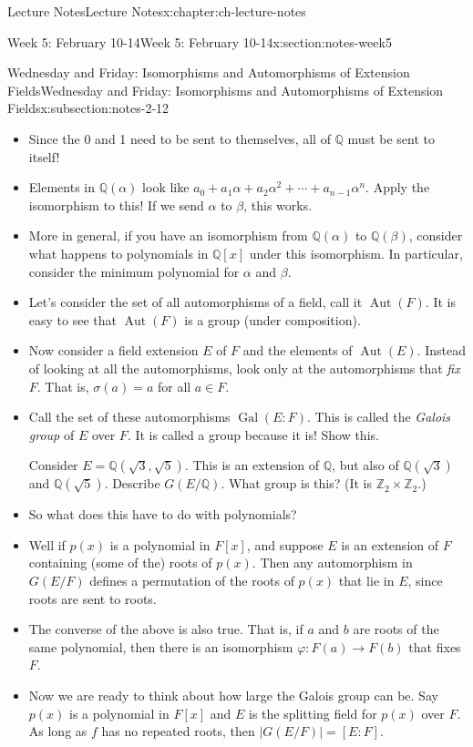 \documentclass[oneside,11pt,]{book}
\newcommand{\Q}{\mathbb{Q}}
\begin{document}
\begin{chapterptx}{Lecture Notes}{}{Lecture Notes}{}{}{x:chapter:ch-lecture-notes}
\begin{sectionptx}{Week 5: February 10-14}{}{Week 5: February 10-14}{}{}{x:section:notes-week5}
\begin{subsectionptx}{Wednesday and Friday: Isomorphisms and Automorphisms of Extension Fields}{}{Wednesday and Friday: Isomorphisms and Automorphisms of Extension Fields}{}{}{x:subsection:notes-2-12}
\begin{itemize}[label=\textbullet]
\item{}Since the 0 and 1 need to be sent to themselves, all of \(\mathbb Q\) must be sent to itself!%
\item{}Elements in \(\mathbb Q(\alpha)\) look like \(a_0 + a_1\alpha + a_2\alpha^2 + \cdots + a_{n-1}\alpha^n\). Apply the isomorphism to this! If we send \(\alpha\) to \(\beta\), this works.%
\item{}More in general, if you have an isomorphism from \(\mathbb Q(\alpha)\) to \(\mathbb Q(\beta)\), consider what happens to polynomials in \(\mathbb Q[x]\) under this isomorphism. In particular, consider the minimum polynomial for \(\alpha\) and \(\beta\).%
\end{itemize}
%
\par
%
\begin{itemize}[label=\textbullet]
\item{}Let’s consider the set of all automorphisms of a field, call it \(\mathop{\mathrm{Aut}}(F)\). It is easy to see that \(\mathop{\mathrm{Aut}}(F)\) is a group (under composition).%
\item{}Now consider a field extension \(E\) of \(F\) and the elements of \(\mathop{\mathrm{Aut}}(E)\). Instead of looking at all the automorphisms, look only at the automorphisms that \emph{fix} \(F\). That is, \(\sigma(a) = a\) for all \(a \in F\).%
\item{}Call the set of these automorphisms \(\mathop{\mathrm{Gal}}(E:F)\). This is called the \emph{Galois group} of \(E\) over \(F\). It is called a group because it is! Show this.%
\par
Consider \(E = \mathbb Q(\sqrt{3}, \sqrt{5})\). This is an extension of \(\mathbb Q\), but also of \(\mathbb Q(\sqrt{3})\) and \(\mathbb Q(\sqrt{5})\). Describe \(G(E/\Q)\). What group is this? (It is \(\mathbb Z_2 \times \mathbb Z_2\).)%
\item{}So what does this have to do with polynomials?%
\item{}Well if \(p(x)\) is a polynomial in \(F[x]\), and suppose \(E\) is an extension of \(F\) containing (some of the) roots of \(p(x)\). Then any automorphism in \(G(E/F)\) defines a permutation of the roots of \(p(x)\) that lie in \(E\), since roots are sent to roots.%
\item{}The converse of the above is also true. That is, if \(a\) and \(b\) are roots of the same polynomial, then there is an isomorphism \(\varphi:F(a) \to F(b)\) that fixes \(F\).%
\item{}Now we are ready to think about how large the Galois group can be. Say \(p(x)\) is a polynomial in \(F[x]\) and \(E\) is the splitting field for \(p(x)\) over \(F\). As long as \(f\) has no repeated roots, then \(|G(E/F)| = [E:F]\).%

\end{itemize}
\end{subsectionptx}
\end{sectionptx}
\end{chapterptx}
\end{document}
